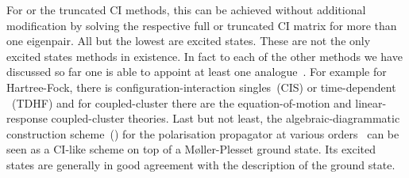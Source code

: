 For \FCI or the truncated CI methods,
this can be achieved without additional modification
by solving the respective full or truncated CI matrix
for more than one eigenpair.
All but the lowest are excited states.
These are not the only excited states methods in existence.
In fact to each of the other methods we have discussed
so far one is able to appoint at least one analogue~\cite{Dreuw2005}.
For example for Hartree-Fock, there is configuration-interaction singles~(CIS)
or time-dependent \HF~(TDHF) and
for coupled-cluster there
are the equation-of-motion and linear-response coupled-cluster theories.
Last but not least, the algebraic-diagrammatic construction scheme~(\ADC)
for the polarisation propagator at various orders~\cite{Schirmer1982,Trofimov1999}
can be seen as a CI-like scheme on top of a Møller-Plesset ground state.
Its excited states are generally in good agreement with the \MP
description of the ground state.
